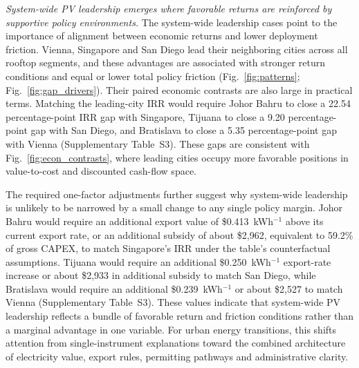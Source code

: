 \documentclass[pdflatex,sn-nature]{sn-jnl}
\begin{document}
\emph{System-wide PV leadership emerges where favorable returns are reinforced by supportive policy environments.} The system-wide leadership cases point to the importance of alignment between economic returns and lower deployment friction. Vienna, Singapore and San Diego lead their neighboring cities across all rooftop segments, and these advantages are associated with stronger return conditions and equal or lower total policy friction (Fig.~\ref{fig:patterns}; Fig.~\ref{fig:gap_drivers}). Their paired economic contrasts are also large in practical terms. Matching the leading-city IRR would require Johor Bahru to close a 22.54 percentage-point IRR gap with Singapore, Tijuana to close a 9.20 percentage-point gap with San Diego, and Bratislava to close a 5.35 percentage-point gap with Vienna (Supplementary Table~S3). These gaps are consistent with Fig.~\ref{fig:econ_contrasts}, where leading cities occupy more favorable positions in value-to-cost and discounted cash-flow space.

The required one-factor adjustments further suggest why system-wide leadership is unlikely to be narrowed by a small change to any single policy margin. Johor Bahru would require an additional export value of \$0.413~kWh$^{-1}$ above its current export rate, or an additional subsidy of about \$2,962, equivalent to 59.2\% of gross CAPEX, to match Singapore's IRR under the table's counterfactual assumptions. Tijuana would require an additional \$0.250~kWh$^{-1}$ export-rate increase or about \$2,933 in additional subsidy to match San Diego, while Bratislava would require an additional \$0.239~kWh$^{-1}$ or about \$2,527 to match Vienna (Supplementary Table~S3). These values indicate that system-wide PV leadership reflects a bundle of favorable return and friction conditions rather than a marginal advantage in one variable. For urban energy transitions, this shifts attention from single-instrument explanations toward the combined architecture of electricity value, export rules, permitting pathways and administrative clarity.
\end{document}

